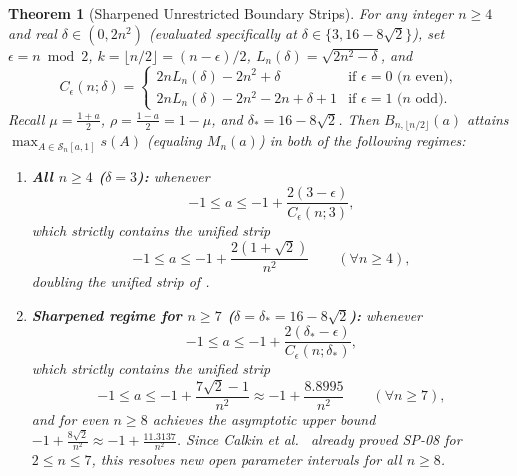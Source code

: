 \documentclass[11pt,reqno]{article}
\newtheorem{theorem}{Theorem}[section]
\theoremstyle{definition}
\begin{document}
\begin{theorem}[Sharpened Unrestricted Boundary Strips]\label{thm:widened-strip}
For any integer $n \ge 4$ and real $\delta \in (0, 2n^2)$ (evaluated specifically at $\delta \in \{3, 16 - 8\sqrt{2}\}$), set $\epsilon = n \bmod 2$, $k = \lfloor n/2 \rfloor = (n - \epsilon)/2$, $L_n(\delta) = \sqrt{2n^2 - \delta}$, and
\[
C_\epsilon(n; \delta) =
\begin{cases}
    2n L_n(\delta) - 2n^2 + \delta & \text{if } \epsilon = 0 \text{ ($n$ even)}, \\
    2n L_n(\delta) - 2n^2 - 2n + \delta + 1 & \text{if } \epsilon = 1 \text{ ($n$ odd)}.
\end{cases}
\]
Recall $\mu = \frac{1+a}{2}$, $\rho = \frac{1-a}{2} = 1 - \mu$, and $\delta_* = 16 - 8\sqrt{2}$. Then $B_{n, \lfloor n/2 \rfloor}(a)$ attains $\max_{A \in \mathcal{S}_n[a, 1]} s(A)$ (equaling $M_n(a)$) in both of the following regimes:
\begin{enumerate}
    \item \textbf{All $n \ge 4$ ($\delta = 3$):} whenever
    \begin{equation}\label{eq:sharp-strip-4}
    -1 \le a \le -1 + \frac{2(3 - \epsilon)}{C_\epsilon(n; 3)},
    \end{equation}
    which strictly contains the unified strip
    \begin{equation}\label{eq:unified-strip-4}
    -1 \le a \le -1 + \frac{2(1 + \sqrt{2})}{n^2} \qquad (\forall n \ge 4),
    \end{equation}
    doubling the unified strip of \cite{holden2026b}.
    \item \textbf{Sharpened regime for $n \ge 7$ ($\delta = \delta_* = 16 - 8\sqrt{2}$):} whenever
    \begin{equation}\label{eq:sharp-strip-7}
    -1 \le a \le -1 + \frac{2(\delta_* - \epsilon)}{C_\epsilon(n; \delta_*)},
    \end{equation}
    which strictly contains the unified strip
    \begin{equation}\label{eq:unified-strip-7}
    -1 \le a \le -1 + \frac{7\sqrt{2} - 1}{n^2} \approx -1 + \frac{8.8995}{n^2} \qquad (\forall n \ge 7),
    \end{equation}
    and for even $n \ge 8$ achieves the asymptotic upper bound $-1 + \frac{8\sqrt{2}}{n^2} \approx -1 + \frac{11.3137}{n^2}$. Since Calkin et al.\ \cite{corless2025bohemian} already proved SP-08 for $2 \le n \le 7$, this resolves new open parameter intervals for all $n \ge 8$.
\end{enumerate}
\end{theorem}
\end{document}
